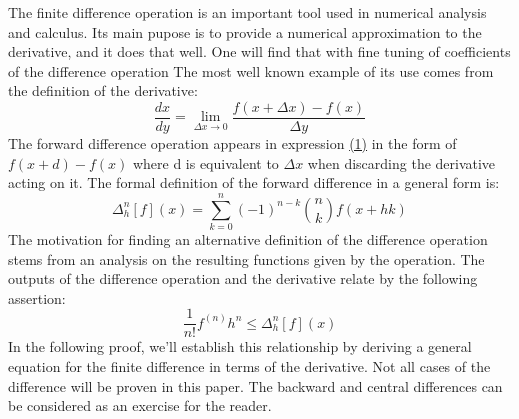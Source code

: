 The finite difference operation is an important tool used in numerical analysis and calculus. Its main pupose is to provide a numerical approximation to the derivative, and it does that well. One will find that with fine tuning of coefficients of the difference operation The most well known example of its use comes from the definition of the derivative:
\begin{equation}
  \frac{dx}{dy}=\lim_{\Delta{x}\to{0}}\frac{f(x+\Delta{x})-f(x)}{\Delta{y}}
  \label{eq:def:derivative}
\end{equation}
The forward difference operation appears in expression \hyperref[eq:def:derivative]{(1)} in the form of $f(x+d)-f(x)$ where d is equivalent to $\Delta{x}$ when discarding the derivative acting on it. The formal definition of the forward difference in a general form is:
\begin{equation}
  \Delta^{n}_{h}\left[f\right]\left(x\right)=\sum^{n}_{k=0}\left(-1\right)^{n-k}\binom{n}{k}f(x+hk)
\end{equation}
The motivation for finding an alternative definition of the difference operation stems from an analysis on the resulting functions given by the operation. The outputs of the difference operation and the derivative relate by the following assertion:
\begin{equation}
  \label{eq:asrt:ordering-df-dv}
  \frac{1}{n!}f^{\left(n\right)}h^n\leq\Delta^n_h\left[f\right]\left(x\right)
\end{equation}
In the following proof, we'll establish this relationship by deriving a general equation for the finite difference in terms of the derivative. Not all cases of the difference will be proven in this paper. The backward and central differences can be considered as an exercise for the reader.

